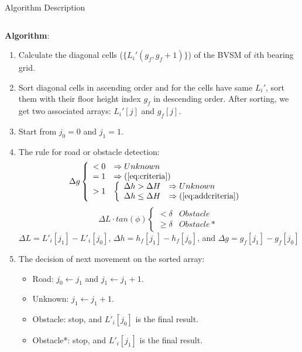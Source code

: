 \documentclass[final,hyperref={pdfpagelabels=false}]{beamer}
\begin{document}
\begin{frame}[t]
\begin{columns}[t]
\begin{column}{.48\textwidth}
\begin{block}{Algorithm Description}
\begin{columns}
\begin{column}{0.49\textwidth}
\begin{framed}
				\textbf{Algorithm}:
				\begin{enumerate}
					\item Calculate the diagonal cells ($\{L_i'(g_f,g_f+1)\}$) of the BVSM of $i$th bearing grid.
					\item Sort diagonal cells in ascending order and for the cells have same $L_i'$, sort them with their floor height index $g_f$ in descending order. After sorting, we get two associated arrays: $L_i'[j]$ and $g_f[j]$.
					\item Start from $j_0=0$ and $j_1=1$.
					\item The rule for road or obstacle detection:
					\small
					\begin{equation*}
					\Delta g
					\left\{
					\begin{array}{cl}
					<0 & \Rightarrow Unknown \\
					=1 & \Rightarrow (\ref{eq:criteria}) \\
					>1 & \left\{
					\begin{array}{cl}
					\Delta h > \Delta H & \Rightarrow Unknown \\
					\Delta h \leq \Delta H & \Rightarrow (\ref{eq:addcriteria})
					\end{array}
					\right.
					\end{array}
					\right.
					\end{equation*}
					\begin{equation}
					\label{eq:addcriteria}
					\Delta L \cdot tan(\phi)\left\{
					\begin{array}{cl}
					<\delta & Obstacle \\
					\geq\delta & Obstacle*  
					\end{array}
					\right. 
					\end{equation}
					$\Delta L = L'_i[j_1] - L'_i[j_0]$, $\Delta h = h_f[j_1]-h_f[j_0]$, and $\Delta g = g_f[j_1]-g_f[j_0]$ 
					
					\item The decision of next movement on the sorted array:
					\begin{itemize}
						\small
						\item Road: $j_0 \leftarrow j_1$ and $j_1 \leftarrow j_1+1$.
						\item Unknown: $j_1 \leftarrow j_1+1$.
						\item Obstacle: stop, and $L'_i[j_0]$ is the final result.
						\item Obstacle*: stop, and $L'_i[j_1]$ is the final result.
					\end{itemize}
					

\end{enumerate}
\end{framed}
\end{column}
\end{columns}
\end{block}
\end{column}
\end{columns}
\end{frame}
\end{document}
